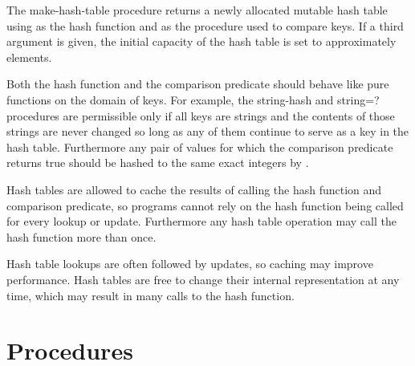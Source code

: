 \begin{entry}{%
}

The {\cf make-hash-table} procedure returns a newly allocated mutable
hash table using  
as the hash function and  as the procedure used to 
compare keys.
If a third argument is given, the 
initial capacity of the hash table is set to approximately  elements.

Both the hash function  and the comparison
predicate  should behave like pure functions
on the domain of keys.  For example, the {\cf string-hash}
and {\cf string=?} procedures are permissible only if all
keys are strings and the contents of those strings are never
changed so long as any of them continue to serve as a key in
the hash table.  Furthermore any pair of values for which
the comparison predicate  returns true should
be hashed to the same exact integers by 
.

\begin{note}
Hash tables are allowed to cache the results of calling the
hash function and comparison predicate, so programs cannot
rely on the hash function being called for every lookup or
update.  Furthermore any hash table operation may call the
hash function more than once.
\end{note}

\begin{rationale}
Hash table lookups are often followed by updates, so caching
may improve performance.  Hash tables are free to change
their internal representation at any time, which may result
in many calls to the hash function.
\end{rationale}

\end{entry}

\section{Procedures}

